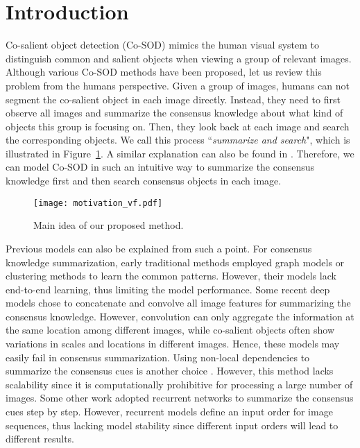 \documentclass[10pt,twocolumn,letterpaper]{article}
\begin{document}
\section{Introduction}
Co-salient object detection (Co-SOD) mimics the human visual system to distinguish common and salient objects when viewing a group of relevant images.
Although various Co-SOD methods have been proposed, let us review this problem from the humans perspective.
Given a group of images, humans can not segment the co-salient object in each image directly. Instead, they need to first observe all images and summarize the consensus knowledge about what kind of objects this group is focusing on. Then, they look back at each image and search the corresponding objects. We call this process ``\emph{summarize and search}", which is illustrated in Figure~\ref{figure1}. A similar explanation can also be found in \cite{zhang2020gicd}. Therefore, we can model Co-SOD in such an intuitive way to summarize the consensus knowledge first and then search consensus objects in each image.

\begin{figure}[!t]
  \graphicspath{{Figures/introduction/}}
  \centering
  \texttt{[image: motivation\_vf.pdf]}
  \caption{Main idea of our proposed method.}
  \label{figure1}
  \vspace{-0.3cm}
\end{figure}

Previous models can also be explained from such a point. For consensus knowledge summarization,
early traditional methods employed graph models \cite{li2011co} or clustering methods \cite{fu2013cluster, yao2017revisiting} to learn the common patterns. However, their models lack end-to-end learning, thus limiting the model performance.
Some recent deep models \cite{wei2019deep, wei2017group, ren2020co} chose to concatenate and convolve all image features for summarizing the consensus knowledge. However, convolution can only aggregate the information at the same location among different images, while co-salient objects often show variations in scales and locations in different images. Hence, these models may easily fail in consensus summarization.
Using non-local dependencies \cite{wang2018non} to summarize the consensus cues is another choice \cite{gao2020co}.
However,
this method lacks scalability since it is computationally prohibitive for processing a large number of images.
Some other work \cite{li2019detecting} adopted recurrent networks to summarize the consensus cues step by step.
However, recurrent models define an input order for image sequences, thus lacking model stability since different input orders will lead to different results.
\end{document}
